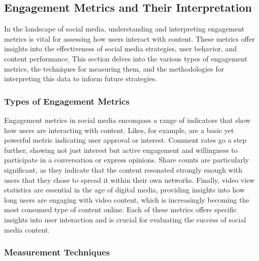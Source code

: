 \documentclass[
]{book}
\begin{document}
\hypertarget{engagement-metrics-and-their-interpretation}{%
\subsection*{Engagement Metrics and Their Interpretation}\label{engagement-metrics-and-their-interpretation}}

In the landscape of social media, understanding and interpreting engagement metrics is vital for assessing how users interact with content. These metrics offer insights into the effectiveness of social media strategies, user behavior, and content performance. This section delves into the various types of engagement metrics, the techniques for measuring them, and the methodologies for interpreting this data to inform future strategies.

\hypertarget{types-of-engagement-metrics}{%
\subsubsection*{Types of Engagement Metrics}\label{types-of-engagement-metrics}}

Engagement metrics in social media encompass a range of indicators that show how users are interacting with content. Likes, for example, are a basic yet powerful metric indicating user approval or interest. Comment rates go a step further, showing not just interest but active engagement and willingness to participate in a conversation or express opinions. Share counts are particularly significant, as they indicate that the content resonated strongly enough with users that they chose to spread it within their own networks. Finally, video view statistics are essential in the age of digital media, providing insights into how long users are engaging with video content, which is increasingly becoming the most consumed type of content online. Each of these metrics offers specific insights into user interaction and is crucial for evaluating the success of social media content.

\hypertarget{measurement-techniques}{%
\subsubsection*{Measurement Techniques}\label{measurement-techniques}}
\end{document}
